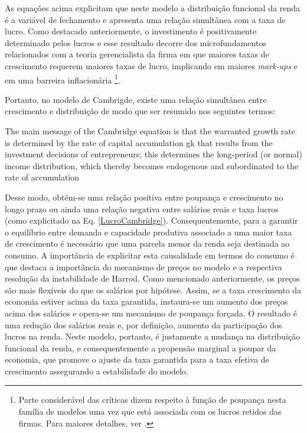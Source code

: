 As equações acima explicitam que neste modelo a distribuição funcional da renda é a variável de fechamento  e apresenta uma relação simultânea com a taxa de lucro. Como destacado anteriormente, o investimento é positivamente determinado pelos lucros e esse resultado decorre dos microfundamentos relacionados com a teoria gerencialista da firma em que maiores taxas de crescimento requerem maiores taxas de lucro, implicando em maiores \textit{mark-ups} e em uma barreira inflacionária \cite[p.~353]{lavoie_post-keynesian_2015} \footnote{Parte considerável das críticas dizem respeito à função de poupança nesta família de modelos uma vez que está associada com os lucros retidos das firmas. Para maiores detalhes, ver  \textcites[Seção III]{skott_kaldoriansaving_1981}{marglin_foundation_1984}{skott_kaldors_1989}.}. 


Portanto, no modelo de Cambrigde, existe uma relação simultânea entre crescimento e distribuição de modo que ser resumido nos seguintes termos:

\begin{citacao}
The main message of the Cambridge
equation is that the warranted growth rate is determined by the rate of capital
accumulation gk that results from the investment decisions of entrepreneurs; this
determines the long-period (or normal) income distribution, which thereby
becomes endogenous and subordinated to the rate of accumulation \cite[p.~158]{cesaratto_neo-kaleckian_2015}
\end{citacao}
Desse modo, obtém-se uma relação positiva entre poupança e crescimento no longo prazo ou ainda uma relação negativa entre salários reais e taxa lucros (como explicitado na Eq. \ref{LucroCambridge}). Consequentemente, para a garantir o equilíbrio entre demanda e capacidade produtiva associado a uma maior taxa de crescimento é necessário que uma parcela menor da renda seja destinada ao consumo. A importância de explicitar esta causalidade em termos do consumo é que destaca a importância do mecanismo de preços no modelo e a respectiva resolução da instabilidade de Harrod. Como mencionado anteriormente, os preços são mais flexíveis do que os salários por hipótese. Assim, se a taxa crescimento da economia estiver acima da taxa garantida, instaura-se um aumento dos preços acima dos salários e opera-se um mecanismo de poupança forçada. O resultado é uma redução dos salários reais e, por definição, aumento da participação dos lucros na renda.  Neste modelo, portanto, é justamente a mudança na distribuição funcional da renda, e consequentemente a propensão marginal a poupar da economia, que promove o ajuste da taxa garantida para a taxa efetiva de crescimento assegurando a estabilidade do modelo.

